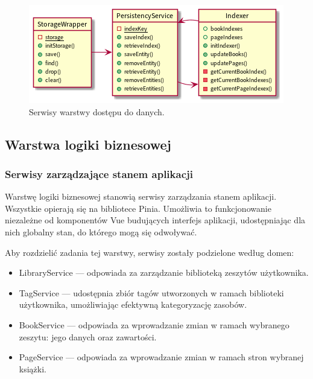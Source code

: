 \begin{figure}[H]
	\begin{center}
		\includegraphics[scale=0.9]{media/PersistencyLayer.png}
	\end{center}
	\caption{Serwisy warstwy dostępu do danych.}
	\label{rys:persistency-layer}
\end{figure}

\subsection{Warstwa logiki biznesowej}
\subsubsection{Serwisy zarządzające stanem aplikacji}
Warstwę logiki biznesowej stanowią serwisy zarządzania stanem aplikacji.
Wszystkie opierają się na bibliotece Pinia.
Umożliwia to funkcjonowanie niezależne od komponentów Vue budujących interfejs aplikacji,
udostępniając dla nich globalny stan, do którego mogą się odwoływać.

Aby rozdzielić zadania tej warstwy, serwisy zostały podzielone według domen:
\begin{itemize}
	\item LibraryService — odpowiada za zarządzanie biblioteką zeszytów użytkownika.
	\item TagService — udostępnia zbiór tagów utworzonych w ramach biblioteki użytkownika, umożliwiając efektywną kategoryzację zasobów.
	\item BookService — odpowiada za wprowadzanie zmian w ramach wybranego zeszytu: jego danych oraz zawartości.
	\item PageService — odpowiada za wprowadzanie zmian w ramach stron wybranej książki.
\end{itemize}

